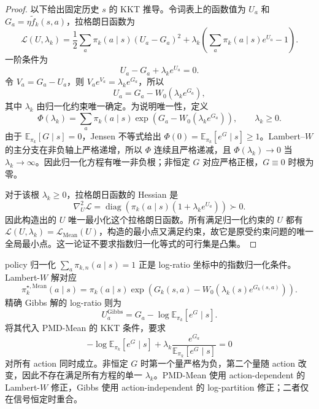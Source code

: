 \begin{proof}
以下给出固定历史 $s$ 的 KKT 推导。令词表上的函数值为 $U_a$ 和 $G_a=\eta\widetilde f_k(s,a)$，拉格朗日函数为
\[
\mathscr L(U,\lambda_k)
=\frac12\sum_a\pi_k(a\mid s)(U_a-G_a)^2
+\lambda_k\left(\sum_a\pi_k(a\mid s)e^{U_a}-1\right).
\]
一阶条件为
\[
U_a-G_a+\lambda_k e^{U_a}=0.
\]
令 $V_a=G_a-U_a$，则 $V_a e^{V_a}=\lambda_k e^{G_a}$，所以
\begin{equation}
\label{eq:ch2-mean-lambert}
U_a=G_a-W_0\!\left(\lambda_k e^{G_a}\right),
\end{equation}
其中 $\lambda_k$ 由归一化约束唯一确定。为说明唯一性，定义
\[
\Phi(\lambda_k)=\sum_a\pi_k(a\mid s)\exp\!\left(G_a-W_0(\lambda_k e^{G_a})\right),\qquad \lambda_k\geq0.
\]
由于 $\mathbb E_{\pi_k}[G\mid s]=0$，Jensen 不等式给出
$\Phi(0)=\mathbb E_{\pi_k}[e^G\mid s]\ge1$。Lambert--$W$ 的主分支在非负轴上严格递增，所以 $\Phi$ 连续且严格递减，且 $\Phi(\lambda_k)\to0$ 当 $\lambda_k\to\infty$。因此归一化方程有唯一非负根；非恒定 $G$ 对应严格正根，$G\equiv0$ 时根为零。

对于该根 $\lambda_k\ge0$，拉格朗日函数的 Hessian 是
\[
\nabla_U^2\mathscr L
=\operatorname{diag}\!\left(\pi_k(a\mid s)(1+\lambda_k e^{U_a})\right)\succ0.
\]
因此构造出的 $U$ 唯一最小化这个拉格朗日函数。所有满足归一化约束的 $U$ 都有 $\mathscr L(U,\lambda_k)=\mathcal L_{\mathrm{Mean}}(U)$，构造的最小点又满足约束，故它是原受约束问题的唯一全局最小点。这一论证不要求指数归一化等式的可行集是凸集。
\end{proof}

policy 归一化 $\sum_a\pi_{k,n}(a\mid s)=1$ 正是 log-ratio 坐标中的指数归一化条件。Lambert-$W$ 解对应
\[
\pi_k^{\star,\mathrm{Mean}}(a\mid s)
=\pi_k(a\mid s)\exp\!\left(G_k(s,a)-W_0(\lambda_k(s)e^{G_k(s,a)})\right).
\]
精确 Gibbs 解的 log-ratio 则为
\[
U_a^{\mathrm{Gibbs}}=G_a-\log\mathbb E_{\pi_k}[e^G\mid s].
\]
将其代入 PMD-Mean 的 KKT 条件，要求
\[
-\log\mathbb E_{\pi_k}[e^G\mid s]
+\lambda_k\frac{e^{G_a}}{\mathbb E_{\pi_k}[e^G\mid s]}=0
\]
对所有 action 同时成立。非恒定 $G$ 时第一个量严格为负，第二个量随 action 改变，因此不存在满足所有方程的单一 $\lambda_k$。PMD-Mean 使用 action-dependent 的 Lambert-$W$ 修正，Gibbs 使用 action-independent 的 log-partition 修正；二者仅在信号恒定时重合。

